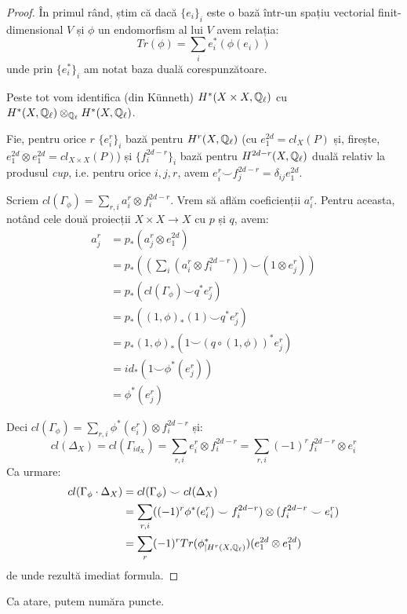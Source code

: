 \documentclass[13pt,openany,oneside]{book}
\begin{document}
\begin{proof}
În primul rând, știm că dacă $\{e_i\}_i$ este o bază într-un spațiu vectorial finit-dimensional $V$ și $\phi$ un endomorfism al lui $V$ avem relația:
$$Tr(\phi)=\sum\limits_i e_i^*(\phi(e_i))$$
unde prin $\{e_i^*\}_i$ am notat baza duală corespunzătoare.

Peste tot vom identifica (din Künneth) $H^*(X\times X,\mathbb{Q}_\ell)$ cu $H^*(X,\mathbb{Q}_\ell) \otimes_{\mathbb{Q}_\ell} H^*(X,\mathbb{Q}_\ell)$.

Fie, pentru orice $r$ $\{e_i^r\}_i$ bază pentru $H^r(X,\mathbb{Q}_\ell)$ (cu $e^{2d}_1=cl_X(P)$ și, firește, $e^{2d}_1 \otimes e^{2d}_1 = cl_{X\times X}(P)$) și $\{f_i^{2d-r}\}_i$ bază pentru $H^{2d-r}(X,\mathbb{Q}_\ell)$ duală relativ la produsul {\it cup}, i.e. pentru orice $i,j,r$, avem $e_i^r \smile f_j^{2d-r} = \delta_{ij}e^{2d}_1$.

Scriem $cl(\Gamma_\phi)=\sum\limits_{r,i} a_i^r \otimes f_i^{2d-r}$. Vrem să aflăm coeficienții $a_i^r$. Pentru aceasta, notând cele două proiecții $X \times X \rightarrow X$ cu $p$ și $q$, avem:
\begin{align*}
a^r_j&=p_*(a^r_j \otimes e^{2d}_1)\\
&=p_* ((\sum\limits_i (a^r_i \otimes f^{2d-r}_i)) \smile (1 \otimes e^r_j)) \\
&= p_*(cl(\Gamma_\phi) \smile q^* e^r_j) \\
&= p_*( (1,\phi)_*(1) \smile q^* e^r_j) \\
&= p_* (1,\phi)_* (1 \smile (q \circ (1,\phi))^*e_j^r)\\
&= id_*(1 \smile \phi^*(e_j^r))\\
&= \phi^*(e_j^r)
\end{align*}

Deci $cl(\Gamma_\phi)=\sum\limits_{r,i} \phi^*(e^r_i) \otimes f^{2d-r}_i$ și:
$$cl(\Delta_X)=cl(\Gamma_{id_X})=\sum\limits_{r,i} e^r_i \otimes f^{2d-r}_i = \sum\limits_{r,i} (-1)^r f_i^{2d-r} \otimes e^r_i$$
Ca urmare:
\begin{align*}
cl(\Gamma_\phi \cdot \Delta_X) &= cl(\Gamma_\phi) \smile cl(\Delta_X) \\
&= \sum\limits_{r,i} ((-1)^r \phi^*(e^r_i) \smile f^{2d-r}_i) \otimes (f^{2d-r}_i \smile e^r_i) \\
&= \sum\limits_r (-1)^r Tr(\phi^*_{\mid H^r(X,\mathbb{Q}_\ell)}) (e^{2d}_1 \otimes e^{2d}_1)
\end{align*}
de unde rezultă imediat formula.
\end{proof}

Ca atare, putem număra puncte.
\end{document}
